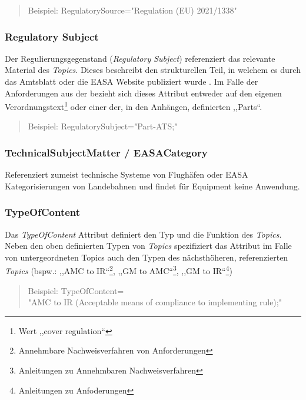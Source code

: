         \begin{quote}
        Beispiel:
        \textsf{RegulatorySource="{}Regulation (EU) 2021/1338"}
    \end{quote}
    
\subsubsection{Regulatory Subject}

    Der Regulierungsgegenstand (\textit{Regulatory Subject}) referenziert das relevante Material des \textit{Topics}. 
    Dieses beschreibt den strukturellen Teil, in welchem es durch das Amtsblatt oder die \ac{EASA} Website publiziert wurde \cite[28]{easa_xml_doc}.
    Im Falle der \atmans{} Anforderungen aus der  bezieht sich dieses Attribut entweder auf den eigenen Verordnungstext\footnote{Wert ,,cover regulation``} oder einer der, in den Anhängen, definierten ,,Parts``.
    \begin{quote}
        Beispiel:
        \textsf{RegulatorySubject="Part-ATS;"}
    \end{quote}
    
    
\subsubsection{TechnicalSubjectMatter / EASACategory}
    
    Referenziert zumeist technische Systeme von Flughäfen oder \ac{EASA} Kategorisierungen von Landebahnen und findet für \atmans{} Equipment keine Anwendung. \cite[28--29, 31]{easa_xml_doc} 
    
\pagebreak
\subsubsection{TypeOfContent}
    
    Das \textit{TypeOfContent} Attribut definiert den Typ und die Funktion des \textit{Topics}.
    Neben den oben definierten Typen von \textit{Topics} spezifiziert das Attribut im Falle von untergeordneten Topics auch den Typen des nächsthöheren, referenzierten \textit{Topics} 
    (bspw.: ,,AMC to IR``\footnote{Annehmbare Nachweisverfahren von Anforderungen}, ,,GM to AMC``\footnote{Anleitungen zu Annehmbaren Nachweisverfahren}, ,,GM to IR``\footnote{Anleitungen zu Anfoderungen})
    
    \begin{quote}
        Beispiel:
        \textsf{TypeOfContent=\\"{}AMC to IR (Acceptable means of compliance to implementing rule);"}
    \end{quote}
    
